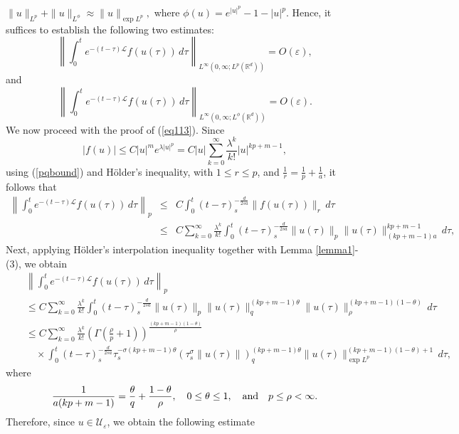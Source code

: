 \documentclass[a4paper,11pt]{amsart}
\numberwithin{equation}{section}
\theoremstyle{plain}
\theoremstyle{definition}
\begin{document}
$\|u\|_{L^p}+\|u\|_{L^\phi}  \approx \|u\|_{\exp L^p},$
where $\phi(u)=e^{|u|^p}-1-|u|^p$. Hence, it suffices to establish the following two estimates:
\begin{equation}\label{eq113}
\left\|\int_0^te^{-(t-\tau)\mathcal{L}} f(u(\tau))\,d\tau\right\|_{L^\infty(0,\infty;L^p(\mathbb{R}^d))}=O(\varepsilon),
\end{equation}
and
\begin{equation}\label{eq14}
\left\|\int_0^te^{-(t-\tau)\mathcal{L}}f(u(\tau))\,d\tau\right\|_{L^\infty(0,\infty;L^\phi(\mathbb{R}^d))}=O(\varepsilon).
\end{equation}
We now proceed with the proof of (\ref{eq113}). Since
$$|f(u)|\leq C|u|^me^{\lambda|u|^p}=C|u|\sum_{k=0}^{\infty}\frac{\lambda^k}{k!}|u|^{kp+m-1},$$
using (\ref{pqbound}) and H\"older's inequality, with $1\leq r\leq p$, and $\frac{1}{r}=\frac{1}{p}+\frac{1}{a}$,  it follows that
\begin{eqnarray*}
\left\|\int_0^te^{-(t-\tau)\mathcal{L}} f(u(\tau))\,d\tau\right\|_{p}&\leq& C\int_0^t(t-\tau)_s^{-\frac{d}{2 sa}}\|f(u(\tau))\|_{r}\,d\tau\\
&\leq& C\sum_{k=0}^{\infty}\frac{\lambda^k}{k!}\int_0^t(t-\tau)_s^{-\frac{d}{2 sa}}\|u(\tau)\|_{p}\|u(\tau)\|^{kp+m-1}_{{(kp+m-1)a}}\,d\tau,
\end{eqnarray*}
Next, applying H\"older's interpolation inequality together with Lemma \ref{lemma1}-(3), we obtain
\begin{eqnarray*}
&{}&\left\|\int_0^te^{-(t-\tau)\mathcal{L}} f(u(\tau))\,d\tau\right\|_{p}\\
&{}&\leq C\sum_{k=0}^{\infty}\frac{\lambda^k}{k!}\int_0^t(t-\tau)_s^{-\frac{d}{2 sa}}\|u(\tau)\|_{p}\|u(\tau)\|^{(kp+m-1)\theta}_{q}\|u(\tau)\|^{(kp+m-1)(1-\theta)}_{\rho}\,d\tau\\
&{}& \leq C\sum_{k=0}^{\infty}\frac{\lambda^k}{k!}\left(\Gamma\left(\frac{\rho}{p}+1\right)\right)^{\frac{(kp+m-1)(1-\theta)}{\rho}}\\
&{}&\quad\times \int_0^t(t-\tau)_s^{-\frac{d}{2 sa}}\tau_s^{-\sigma(kp+m-1)\theta}\left(\tau_s^{\sigma}\|u(\tau)\|\right)^{(kp+m-1)\theta}_{q} \|u(\tau)\|^{(kp+m-1)(1-\theta)+1}_{\exp L^p}\,d\tau ,\qquad
\end{eqnarray*}
where
\begin{equation}\label{propA}
\frac{1}{a(kp+m-1)}=\frac{\theta}{q}+\frac{1-\theta}{\rho},\quad 0\leq \theta\leq 1,\quad\hbox{and}\quad p\leq\rho<\infty.
\end{equation}
Therefore, since $u\in \mathcal{U}_\varepsilon$, we obtain the following estimate
\end{document}
